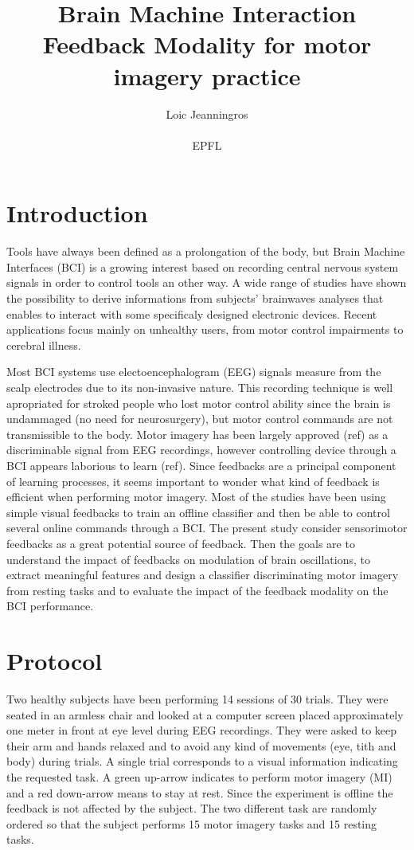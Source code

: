 \documentclass{article} %
\title{Brain Machine Interaction \\ Feedback Modality for motor imagery practice}
\author{
Loic Jeanningros\\
\\
EPFL \\
}
\begin{document}
\maketitle
\section{Introduction}
Tools have always been defined as a prolongation of the body, but Brain Machine Interfaces (BCI) is a growing interest based on recording central nervous system signals in order to control tools an other way. A wide range of studies have shown the possibility to derive informations from subjects' brainwaves analyses that enables to interact with some specificaly designed electronic devices. Recent applications focus mainly on unhealthy users, from motor control impairments to cerebral illness. 

Most BCI systems use electoencephalogram (EEG) signals measure from the scalp electrodes due to its non-invasive nature. This recording technique is well apropriated for stroked people who lost motor control ability since the brain is undammaged (no need for neurosurgery), but motor control commands are not transmissible to the body. Motor imagery has been largely approved (ref) as a discriminable signal from EEG recordings, however controlling device through a BCI appears laborious to learn (ref). Since feedbacks are a principal component of learning processes, it seems important to wonder what kind of feedback is efficient when performing motor imagery. Most of the studies have been using simple visual feedbacks to train an offline classifier and then be able to control several online commands through a BCI. The present study consider sensorimotor feedbacks as a great potential source of feedback. Then the goals are to understand the impact of feedbacks on modulation of brain oscillations, to extract meaningful features and design a classifier discriminating motor imagery from resting tasks and to evaluate the impact of the feedback modality on the BCI performance.



\section{Protocol}

Two healthy subjects have been performing 14 sessions of 30 trials. They were seated in an armless chair and looked at a computer screen placed approximately one meter in front at eye level during EEG recordings. They were asked to keep their arm and hands relaxed and to avoid any kind of movements (eye, tith and body) during trials.  A single trial corresponds to a visual information indicating the requested task. A green up-arrow indicates to perform motor imagery (MI) and a red down-arrow means to stay at rest. Since the experiment is offline the feedback is not affected by the subject. The two different task are randomly ordered so that the subject performs 15 motor imagery tasks and 15 resting tasks.
\end{document}

